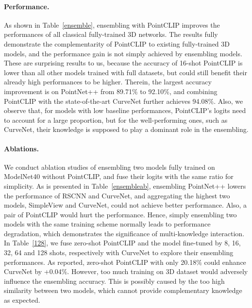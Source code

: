 \documentclass[10pt,twocolumn,letterpaper]{article}
\begin{document}
\vspace*{-8pt}
\paragraph{Performance.} As shown in Table~\ref{ensemble}, ensembling with PointCLIP improves the performances of all classical fully-trained 3D networks. The results fully demonstrate the complementarity of PointCLIP to existing fully-trained 3D models, and the performance gain is not simply achieved by ensembling models. These are surprising results to us, because the accuracy of 16-shot PointCLIP is lower than all other models trained with full datasets, but could still benefit their already high performances to be higher. Therein, the largest accuracy improvement is on PointNet++ from 89.71$\%$ to 92.10$\%$, and combining PointCLIP with the state-of-the-art CurveNet further achieves 94.08$\%$. Also, we observe that, for models with low baseline performances, PointCLIP's logits need to account for a large proportion, but for the well-performing ones, such as CurveNet, their knowledge is supposed to play a dominant role in the ensembling. 

\vspace*{-8pt}
\paragraph{Ablations.} We conduct ablation studies of ensembling two models fully trained on ModelNet40 without PointCLIP, and fuse their logits with the same ratio for simplicity. As is presented in Table~\ref{ensembleab}, ensembling PointNet++ lowers the performance of RSCNN and CurveNet, and aggregating the highest two models, SimpleView and CurveNet, could not achieve better performance. Also, a pair of PointCLIP would hurt the performance. Hence, simply ensembling two models with the same training scheme normally leads to performance degradation, which demonstrates the significance of multi-knowledge interaction. In Table~\ref{128}, we fuse zero-shot PointCLIP and the model fine-tuned by 8, 16, 32, 64 and 128 shots, respectively with CurveNet to explore their ensembling performances. As reported, zero-shot PointCLIP with only 20.18$\%$ could enhance CurveNet by +0.04$\%$. However, too much training on 3D dataset would adversely influence the ensembling accuracy. This is possibly caused by the too high similarity between two models, which cannot provide complementary knowledge as expected.
\end{document}
